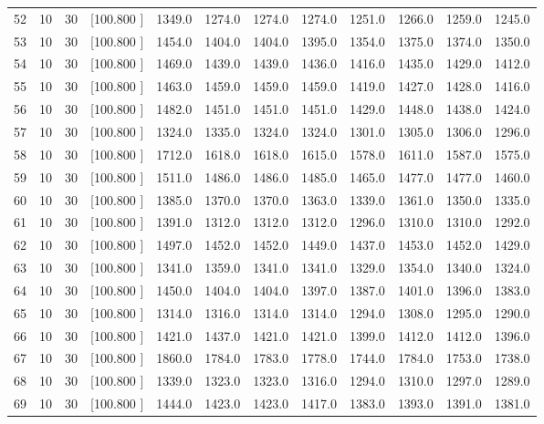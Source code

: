 \documentclass[12pt,a4paper]{article}
\begin{document}
\begin{center}
{\begin{tabular}{r r r r r r r r r r r r}
  52& 10& 30&[100.800   ]&  1349.0&  1274.0&  1274.0&  1274.0&  1251.0&  1266.0&  1259.0&  1245.0\\[-0.02in]
  53& 10& 30&[100.800   ]&  1454.0&  1404.0&  1404.0&  1395.0&  1354.0&  1375.0&  1374.0&  1350.0\\[-0.02in]
  54& 10& 30&[100.800   ]&  1469.0&  1439.0&  1439.0&  1436.0&  1416.0&  1435.0&  1429.0&  1412.0\\[-0.02in]
  55& 10& 30&[100.800   ]&  1463.0&  1459.0&  1459.0&  1459.0&  1419.0&  1427.0&  1428.0&  1416.0\\[-0.02in]
  56& 10& 30&[100.800   ]&  1482.0&  1451.0&  1451.0&  1451.0&  1429.0&  1448.0&  1438.0&  1424.0\\[-0.02in]
  57& 10& 30&[100.800   ]&  1324.0&  1335.0&  1324.0&  1324.0&  1301.0&  1305.0&  1306.0&  1296.0\\[-0.02in]
  58& 10& 30&[100.800   ]&  1712.0&  1618.0&  1618.0&  1615.0&  1578.0&  1611.0&  1587.0&  1575.0\\[-0.02in]
  59& 10& 30&[100.800   ]&  1511.0&  1486.0&  1486.0&  1485.0&  1465.0&  1477.0&  1477.0&  1460.0\\[-0.02in]
  60& 10& 30&[100.800   ]&  1385.0&  1370.0&  1370.0&  1363.0&  1339.0&  1361.0&  1350.0&  1335.0\\[-0.02in]
  61& 10& 30&[100.800   ]&  1391.0&  1312.0&  1312.0&  1312.0&  1296.0&  1310.0&  1310.0&  1292.0\\[-0.02in]
  62& 10& 30&[100.800   ]&  1497.0&  1452.0&  1452.0&  1449.0&  1437.0&  1453.0&  1452.0&  1429.0\\[-0.02in]
  63& 10& 30&[100.800   ]&  1341.0&  1359.0&  1341.0&  1341.0&  1329.0&  1354.0&  1340.0&  1324.0\\[-0.02in]
  64& 10& 30&[100.800   ]&  1450.0&  1404.0&  1404.0&  1397.0&  1387.0&  1401.0&  1396.0&  1383.0\\[-0.02in]
  65& 10& 30&[100.800   ]&  1314.0&  1316.0&  1314.0&  1314.0&  1294.0&  1308.0&  1295.0&  1290.0\\[-0.02in]
  66& 10& 30&[100.800   ]&  1421.0&  1437.0&  1421.0&  1421.0&  1399.0&  1412.0&  1412.0&  1396.0\\[-0.02in]
  67& 10& 30&[100.800   ]&  1860.0&  1784.0&  1783.0&  1778.0&  1744.0&  1784.0&  1753.0&  1738.0\\[-0.02in]
  68& 10& 30&[100.800   ]&  1339.0&  1323.0&  1323.0&  1316.0&  1294.0&  1310.0&  1297.0&  1289.0\\[-0.02in]
  69& 10& 30&[100.800   ]&  1444.0&  1423.0&  1423.0&  1417.0&  1383.0&  1393.0&  1391.0&  1381.0\\[-0.02in]

\end{tabular}}
\end{center}
\end{document}
